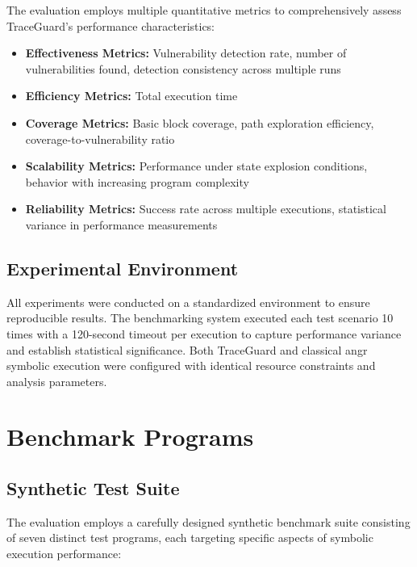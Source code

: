 The evaluation employs multiple quantitative metrics to comprehensively assess TraceGuard's performance characteristics:

\begin{itemize}
    \item \textbf{Effectiveness Metrics:} Vulnerability detection rate, number of vulnerabilities found, detection consistency across multiple runs
    \item \textbf{Efficiency Metrics:} Total execution time
    \item \textbf{Coverage Metrics:} Basic block coverage, path exploration efficiency, coverage-to-vulnerability ratio
    \item \textbf{Scalability Metrics:} Performance under state explosion conditions, behavior with increasing program complexity
    \item \textbf{Reliability Metrics:} Success rate across multiple executions, statistical variance in performance measurements
\end{itemize}

\subsection{Experimental Environment}

All experiments were conducted on a standardized environment to ensure reproducible results. The benchmarking system executed each test scenario 10 times with a 120-second timeout per execution to capture performance variance and establish statistical significance. Both TraceGuard and classical angr symbolic execution were configured with identical resource constraints and analysis parameters.

\section{Benchmark Programs}

\subsection{Synthetic Test Suite}

The evaluation employs a carefully designed synthetic benchmark suite consisting of seven distinct test programs, each targeting specific aspects of symbolic execution performance:

